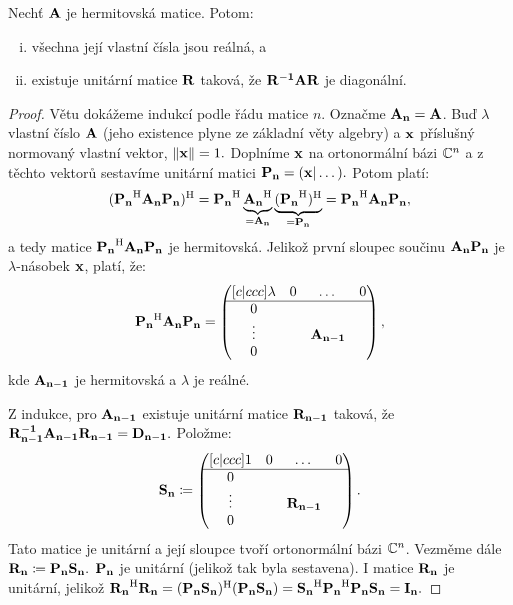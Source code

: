 \begin{theorem}
    \label{th:hermunitr}
    Nechť $\mathbf{A}$ je hermitovská matice. Potom:
    \begin{enumerate}[i.]
        \item všechna její vlastní čísla jsou reálná, a
        \item existuje unitární matice $\mathbf{R}$ taková, že $\mathbf{R^{-1}} \mathbf{A} \mathbf{R}$ je 
            diagonální.
    \end{enumerate}
\end{theorem}

\begin{proof}
    Větu dokážeme indukcí podle řádu matice $n$. Označme $\mathbf{A_n} = \mathbf{A}$.
    Buď $\lambda$ vlastní číslo $\mathbf{A}$ (jeho existence plyne ze základní
    věty algebry) a $\mathbf{x}$ příslušný normovaný vlastní vektor,
    $\|\mathbf{x}\| = 1.$ Doplníme $\mathbf{x}$ na ortonormální bázi $\mathbb{C}^n$ a z těchto
    vektorů sestavíme unitární matici $\mathbf{P_n} = (\mathbf{x} | \dots).$
    Potom platí: $$(\mathbf{P_n}^{\mathrm{H}} \mathbf{A_n} \mathbf{P_n})^{\mathrm{H}} = \mathbf{P_n}^{\mathrm{H}} 
    \underbrace{\mathbf{A_n}^{\mathrm{H}}}_{=\mathbf{A_n}} 
    \underbrace{(\mathbf{P_n}^{\mathrm{H}})^{\mathrm{H}}}_{=\mathbf{P_n}} = \mathbf{P_n}^{\mathrm{H}} \mathbf{A_n} \mathbf{P_n},$$
    a tedy matice $\mathbf{P_n}^{\mathrm{H}} \mathbf{A_n} \mathbf{P_n}$ je hermitovská.
    Jelikož první sloupec součinu $\mathbf{A_n} \mathbf{P_n}$ je $\lambda$-násobek $\mathbf{x}$,
    platí, že: $$\mathbf{P_n}^{\mathrm{H}} \mathbf{A_n} \mathbf{P_n} = \begin{pmatrix}[c|ccc]
        \lambda &0 &\dots &0 \\
        \hline
        0 & & &\\
        \vdots & &\mathbf{A_{n-1}} & \\
             0 & & &
    \end{pmatrix},$$
    kde $\mathbf{A_{n-1}}$ je hermitovská a $\lambda$ je reálné.

    Z indukce, pro $\mathbf{A_{n-1}}$ existuje unitární matice $\mathbf{R_{n-1}}$
    taková, že $\mathbf{R_{n-1}^{-1}} \mathbf{A_{n-1}} \mathbf{R_{n-1}} = \mathbf{D_{n-1}}.$
    Položme: $$\mathbf{S_n} \coloneqq \begin{pmatrix}[c|ccc]
        1 &0 &\dots &0 \\
        \hline
        0 & & &\\
        \vdots & &\mathbf{R_{n-1}} & \\
             0 & & &
    \end{pmatrix}.$$
    Tato matice je unitární a její sloupce tvoří ortonormální bázi $\mathbb{C}^n$.
    Vezměme dále $\mathbf{R_n} \coloneqq \mathbf{P_n} \mathbf{S_n}.$ $\mathbf{P_n}$ je unitární (jelikož
    tak byla sestavena). I matice $\mathbf{R_n}$ je unitární, jelikož 
    $\mathbf{R_n}^{\mathrm{H}} \mathbf{R_n} = (\mathbf{P_n} \mathbf{S_n})^{\mathrm{H}} (\mathbf{P_n} \mathbf{S_n}) = 
    \mathbf{S_n}^{\mathrm{H}} \mathbf{P_n}^{\mathrm{H}} \mathbf{P_n} \mathbf{S_n} = \mathbf{I_{n}}.$


\end{proof}
